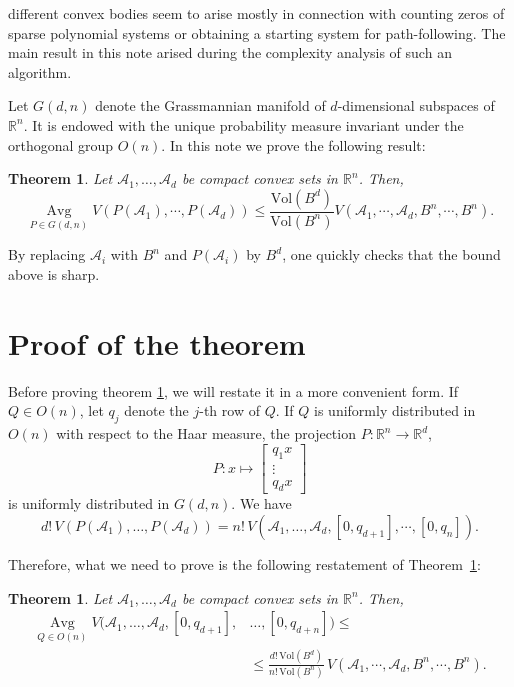 \documentclass{amsart}
\newtheorem{theorem}{Theorem}
\newtheorem{subtheorem}{Theorem}
\theoremstyle{definition}
\theoremstyle{remark}
\begin{document}
different convex bodies seem to arise mostly in connection with counting
zeros of sparse polynomial systems or obtaining a starting system for
path-following. The main result in this note arised during the complexity 
analysis of such an algorithm.
\medskip
\par
Let $G(d,n)$ denote the Grassmannian manifold of $d$-dimensional subspaces of $\mathbb R^n$. It is
endowed with the unique probability measure invariant under the orthogonal group $O(n)$.
In this note we prove the following result:
\begin{theorem}\label{main} Let $\mathcal A_1, \dots, \mathcal A_d$ be compact convex sets in $\mathbb R^n$. 
Then,
\[
{\operatorname*{Avg}_{{P \in G(d,n)}}} V(P(\mathcal A_1), \cdots, P(\mathcal A_d))  \le
\frac
{{\mathrm{Vol}}(B^d)}
{{\mathrm{Vol}}(B^n)}
V(\mathcal A_1, \cdots, \mathcal A_d, B^n, \cdots, B^n) 
.
\]
\end{theorem}

By replacing $\mathcal A_i$ with $B^n$ and $P(\mathcal A_i)$ by $B^d$, one quickly checks that the
bound above is sharp.

\section{Proof of the theorem}

Before proving theorem \ref{main}, we will restate it in a more convenient form.
If $Q \in O(n)$, let $q_j$ denote the $j$-th row of $Q$. If $Q$ is uniformly distributed
in $O(n)$ with respect to the Haar measure, the projection $P: \mathbb R^n \rightarrow \mathbb R^d$,
\[
P: x \mapsto 
\left[
\begin{matrix} 
q_1 x \\ \vdots \\ q_d x
\end{matrix}
\right]
\]
is uniformly distributed in $G(d,n)$. We have
\[
d!\, V( P(\mathcal A_1), \dots, P(\mathcal A_d)) = n!\, V(\mathcal A_1, \dots, \mathcal A_d, [0, q_{d+1}], \cdots, [0, q_n])
.
\]

Therefore, what we need to prove is the following restatement of Theorem~\ref{main}:

\begin{subtheorem} Let $\mathcal A_1, \dots, \mathcal A_d$ be compact convex sets in $\mathbb R^n$. 
Then,
\[
\begin{split}
{\operatorname*{Avg}_{{Q \in O(n)}}} V(\mathcal A_1, \dots, \mathcal A_d, [0,q_{d+1}],& \dots, [0,q_{d+n}])  \le\\
&
\le 
\frac
{d!\, {\mathrm{Vol}}(B^d)}
{n!\, {\mathrm{Vol}}(B^n)}
\, V(\mathcal A_1, \cdots, \mathcal A_d, B^n, \cdots, B^n) 
.
\end{split}
\]
\end{subtheorem}
\end{document}
